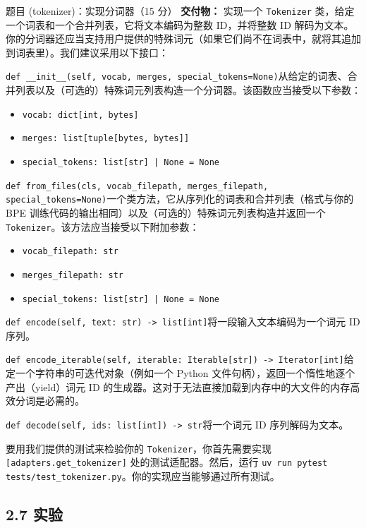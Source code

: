 \begin{problembox}{题目 (tokenizer)：实现分词器（15 分）}
\textbf{交付物：} 实现一个 \texttt{Tokenizer} 类，给定一个词表和一个合并列表，它将文本编码为整数 ID，并将整数 ID 解码为文本。你的分词器还应当支持用户提供的特殊词元（如果它们尚不在词表中，就将其追加到词表里）。我们建议采用以下接口：

\medskip
\texttt{def \_\_init\_\_(self, vocab, merges, special\_tokens=None)}\quad 从给定的词表、合并列表以及（可选的）特殊词元列表构造一个分词器。该函数应当接受以下参数：
\begin{itemize}[leftmargin=2em]
\item \texttt{vocab: dict[int, bytes]}
\item \texttt{merges: list[tuple[bytes, bytes]]}
\item \texttt{special\_tokens: list[str] | None = None}
\end{itemize}

\texttt{def from\_files(cls, vocab\_filepath, merges\_filepath, special\_tokens=None)}\quad 一个类方法，它从序列化的词表和合并列表（格式与你的 BPE 训练代码的输出相同）以及（可选的）特殊词元列表构造并返回一个 \texttt{Tokenizer}。该方法应当接受以下附加参数：
\begin{itemize}[leftmargin=2em]
\item \texttt{vocab\_filepath: str}
\item \texttt{merges\_filepath: str}
\item \texttt{special\_tokens: list[str] | None = None}
\end{itemize}

\texttt{def encode(self, text: str) -> list[int]}\quad 将一段输入文本编码为一个词元 ID 序列。

\texttt{def encode\_iterable(self, iterable: Iterable[str]) -> Iterator[int]}\quad 给定一个字符串的可迭代对象（例如一个 Python 文件句柄），返回一个惰性地逐个产出（yield）词元 ID 的生成器。这对于无法直接加载到内存中的大文件的内存高效分词是必需的。

\texttt{def decode(self, ids: list[int]) -> str}\quad 将一个词元 ID 序列解码为文本。

\medskip
要用我们提供的测试来检验你的 \texttt{Tokenizer}，你首先需要实现 \texttt{[adapters.get\_tokenizer]} 处的测试适配器。然后，运行 \texttt{uv run pytest tests/test\_tokenizer.py}。你的实现应当能够通过所有测试。
\end{problembox}

\subsection*{2.7 实验}

